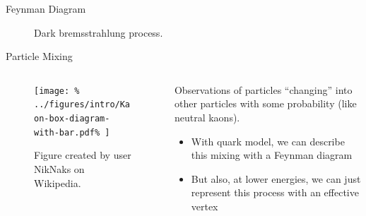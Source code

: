 \documentclass[aspectratio=169]{beamer}
\begin{document}

\begin{frame}{Feynman Diagram}
   \begin{figure}
     \centering
     
     \caption{Dark bremsstrahlung process.}
   \end{figure}
\end{frame}


\begin{frame}{Particle Mixing}
  \begin{columns}
    \begin{column}{0.4\textwidth}
      \begin{figure}
        \texttt{[image: \%
          ../figures/intro/Kaon-box-diagram-with-bar.pdf\%
        ]}
        \caption{Figure created by user NikNaks on Wikipedia.}
      \end{figure}
    \end{column}
    \begin{column}{0.6\textwidth}
      Observations of particles ``changing'' into other particles with some probability
      (like neutral kaons).
      \begin{itemize}
        \item With quark model, we can describe this mixing with a Feynman diagram
        \item But also, at lower energies, we can just represent this process with
          an effective vertex
      \end{itemize}
    \end{column}
  \end{columns}
\end{frame}
\end{document}
